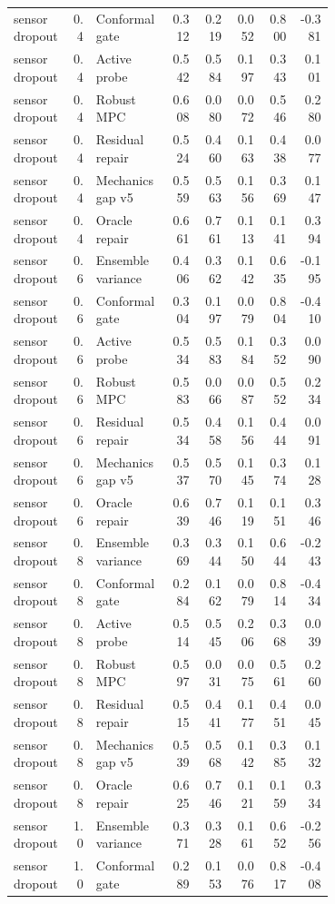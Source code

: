 \documentclass{article}
\begin{document}
\begin{center}
\begin{longtable}{p{0.18\linewidth}rp{0.23\linewidth}rrrrr}
sensor dropout & 0.4 & Conformal gate & 0.312 & 0.219 & 0.052 & 0.800 & -0.381\\
sensor dropout & 0.4 & Active probe & 0.542 & 0.584 & 0.197 & 0.343 & 0.101\\
sensor dropout & 0.4 & Robust MPC & 0.608 & 0.080 & 0.072 & 0.546 & 0.280\\
sensor dropout & 0.4 & Residual repair & 0.524 & 0.460 & 0.163 & 0.438 & 0.077\\
sensor dropout & 0.4 & Mechanics gap v5 & 0.559 & 0.563 & 0.156 & 0.369 & 0.147\\
sensor dropout & 0.4 & Oracle repair & 0.661 & 0.761 & 0.113 & 0.141 & 0.394\\
sensor dropout & 0.6 & Ensemble variance & 0.406 & 0.362 & 0.142 & 0.635 & -0.195\\
sensor dropout & 0.6 & Conformal gate & 0.304 & 0.197 & 0.079 & 0.804 & -0.410\\
sensor dropout & 0.6 & Active probe & 0.534 & 0.583 & 0.184 & 0.352 & 0.090\\
sensor dropout & 0.6 & Robust MPC & 0.583 & 0.066 & 0.087 & 0.552 & 0.234\\
sensor dropout & 0.6 & Residual repair & 0.534 & 0.458 & 0.156 & 0.444 & 0.091\\
sensor dropout & 0.6 & Mechanics gap v5 & 0.537 & 0.570 & 0.145 & 0.374 & 0.128\\
sensor dropout & 0.6 & Oracle repair & 0.639 & 0.746 & 0.119 & 0.151 & 0.346\\
sensor dropout & 0.8 & Ensemble variance & 0.369 & 0.344 & 0.150 & 0.644 & -0.243\\
sensor dropout & 0.8 & Conformal gate & 0.284 & 0.162 & 0.079 & 0.814 & -0.434\\
sensor dropout & 0.8 & Active probe & 0.514 & 0.545 & 0.206 & 0.368 & 0.039\\
sensor dropout & 0.8 & Robust MPC & 0.597 & 0.031 & 0.075 & 0.561 & 0.260\\
sensor dropout & 0.8 & Residual repair & 0.515 & 0.441 & 0.177 & 0.451 & 0.045\\
sensor dropout & 0.8 & Mechanics gap v5 & 0.539 & 0.568 & 0.142 & 0.385 & 0.132\\
sensor dropout & 0.8 & Oracle repair & 0.625 & 0.746 & 0.121 & 0.159 & 0.334\\
sensor dropout & 1.0 & Ensemble variance & 0.371 & 0.328 & 0.161 & 0.652 & -0.256\\
sensor dropout & 1.0 & Conformal gate & 0.289 & 0.153 & 0.076 & 0.817 & -0.408\\

\end{longtable}
\end{center}
\end{document}
